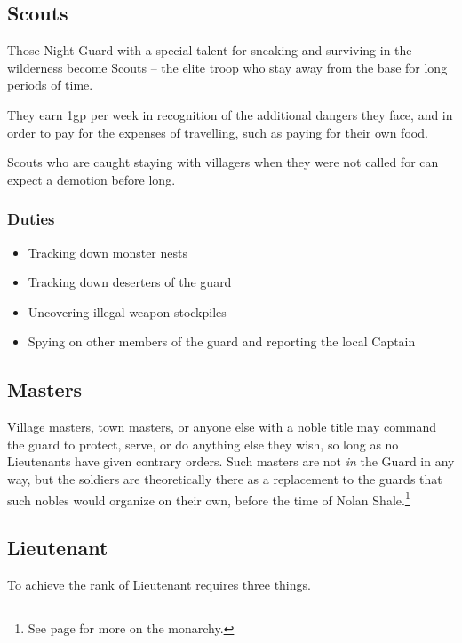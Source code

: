 \begin{multicols}{2}
\subsection{Scouts}

Those Night Guard with a special talent for sneaking and surviving in the wilderness become Scouts -- the elite troop who stay away from the base for long periods of time.

They earn 1gp per week in recognition of the additional dangers they face, and in order to pay for the expenses of travelling, such as paying for their own food.

Scouts who are caught staying with villagers when they were not called for can expect a demotion before long.

\subsubsection{Duties}

\begin{itemize}

  \item{Tracking down monster nests}
  \item{Tracking down deserters of the \gls{guard}}
  \item{Uncovering illegal weapon stockpiles}
  \item{Spying on other members of the \gls{guard} and reporting the local Captain}

\end{itemize}

\subsection{Masters}

Village masters, town masters, or anyone else with a noble title may command the \gls{guard} to protect, serve, or do anything else they wish, so long as no Lieutenants have given contrary orders.
Such masters are not \textit{in} the Guard in any way, but the soldiers are theoretically there as a replacement to the guards that such nobles would organize on their own, before the time of Nolan Shale.\footnote{See page \pageref{nolan} for more on the monarchy.}

\subsection{Lieutenant}

To achieve the rank of Lieutenant requires three things.


\end{multicols}
